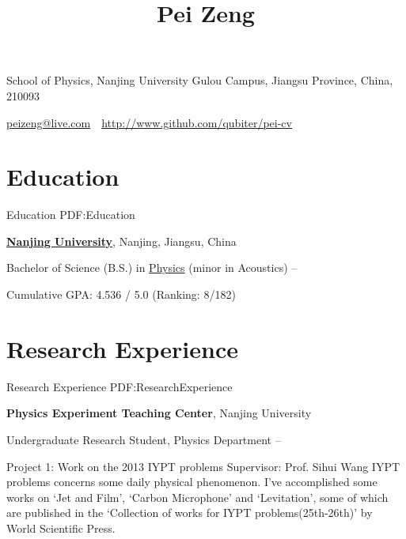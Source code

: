 \documentclass[letterpaper,MMMyyyy,nonstop]{simpleresumecv}
\newcommand{\CVAuthor}{Pei Zeng}
\newcommand{\CVWebpage}{http://www.github.com/qubiter/pei-cv}
\begin{document}

\title{\CVAuthor}

\begin{subtitle}
School of Physics, Nanjing University Gulou Campus, Jiangsu Province, China, 210093
\par
\href{peizeng@live.com}
{peizeng@live.com}
\,\SubBulletSymbol\,
\href{\CVWebpage}
{\CVWebpage}
\end{subtitle}

\begin{body}


\section
{Education}
{Education}
{PDF:Education}

\href{http://www.nju.edu.cn}
{\textbf{Nanjing University}},
Nanjing, Jiangsu, China

\GapNoBreak
\BulletItem
Bachelor of Science (B.S.) in
\href{http://physics.nju.edu.cn/}
{Physics} (minor in Acoustics)
\hfill
{} --
\begin{detail}
\SubBulletItem
Cumulative GPA: 4.536 / 5.0 (Ranking: 8/182)
\end{detail}


\section
{Research Experience}
{Research Experience}
{PDF:ResearchExperience}


\textbf{Physics Experiment Teaching Center},
Nanjing University

\GapNoBreak
\BulletItem
Undergraduate Research Student, Physics Department
\hfill
{} --
\begin{detail}
\SubBulletItem
Project 1: Work on the 2013 IYPT problems
\SubBulletItem
Supervisor: 
Prof. Sihui Wang
\SubBulletItem
IYPT problems concerns some daily physical phenomenon. I’ve accomplished some works on ‘Jet and Film’, ‘Carbon Microphone’ and ‘Levitation’, some of which are published in the ‘Collection of works for IYPT problems(25th-26th)’ by World Scientific Press.
\end{detail}


\end{body}
\end{document}
